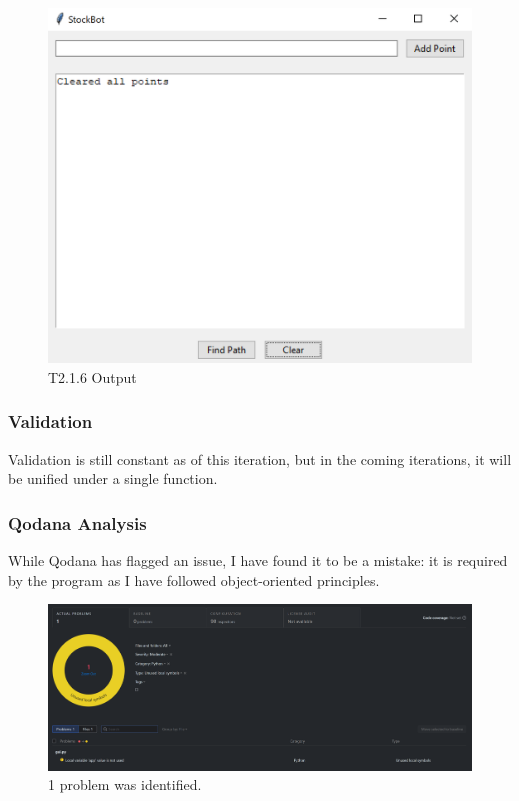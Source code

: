 \begin{figure}[htbp!]
	\centering
	\includegraphics[width=1\linewidth]{Images/sprintbtest3.png}
	\caption{T2.1.6 Output}
\end{figure}

\newpage %

\subsubsection{Validation}

Validation is still constant as of this iteration, but in the coming iterations, it will be unified under a single function.

\subsubsection{Qodana Analysis}
While Qodana has flagged an issue, I have found it to be a mistake: it is required by the program as I have followed object-oriented principles.

\begin{figure}[htbp!]
	\centering
	\includegraphics[width=0.85\linewidth]{Images/qodana-sb1.png}
	\caption{1 problem was identified.}
\end{figure}



